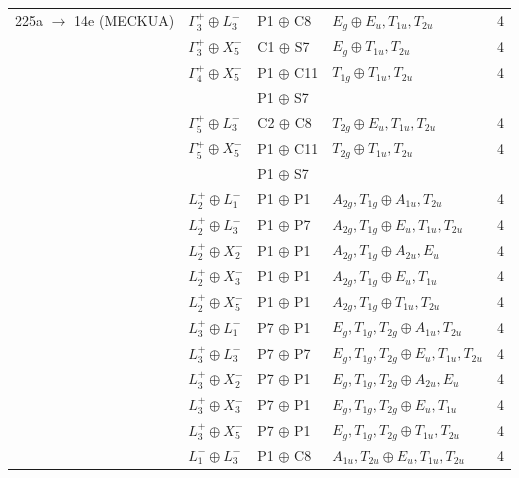 \documentclass[preprint]{iucr}              %
\begin{document}
\begin{table}
\begin{tabular}{lllll}
225a $\rightarrow$ 14e (MECKUA) & $\Gamma_3^+ \oplus L_3^-$ & P1 $\oplus$ C8 & $E_g \oplus E_u,T_{1u},T_{2u}$ & 4 \\
& $\Gamma_3^+ \oplus X_5^-$ & C1 $\oplus$ S7 & $E_g \oplus T_{1u},T_{2u}$ & 4 \\
& $\Gamma_4^+ \oplus X_5^-$ & P1 $\oplus$ C11  & $T_{1g} \oplus T_{1u},T_{2u}$ & 4 \\
& & P1 $\oplus$ S7 \\
& $\Gamma_5^+ \oplus L_3^-$ & C2 $\oplus$ C8 & $T_{2g} \oplus E_u,T_{1u},T_{2u}$ & 4 \\
& $\Gamma_5^+ \oplus X_5^-$ & P1 $\oplus$ C11 & $T_{2g} \oplus T_{1u},T_{2u}$ & 4 \\
& & P1 $\oplus$ S7 & &  \\
& $L_2^+ \oplus L_1^-$ & P1 $\oplus$ P1 & $A_{2g},T_{1g} \oplus A_{1u},T_{2u}$ & 4 \\

& $L_2^+ \oplus L_3^-$ &  P1 $\oplus$ P7 & $A_{2g},T_{1g} \oplus E_u,T_{1u},T_{2u}$ & 4 \\

& $L_2^+ \oplus X_2^-$ &  P1 $\oplus$ P1 & $A_{2g},T_{1g} \oplus A_{2u},E_u$ & 4 \\

& $L_2^+ \oplus X_3^-$ &  P1 $\oplus$ P1 & $A_{2g},T_{1g} \oplus E_u,T_{1u}$ & 4 \\

& $L_2^+ \oplus X_5^-$ &  P1 $\oplus$ P1 & $A_{2g},T_{1g} \oplus T_{1u},T_{2u}$ & 4 \\

& $L_3^+ \oplus L_1^-$ &  P7 $\oplus$ P1 & $E_g,T_{1g},T_{2g} \oplus A_{1u},T_{2u}$ & 4 \\

& $L_3^+ \oplus L_3^-$ &  P7 $\oplus$ P7 & $E_g,T_{1g},T_{2g} \oplus E_u,T_{1u},T_{2u}$ & 4 \\

& $L_3^+ \oplus X_2^-$ &  P7 $\oplus$ P1 & $E_g,T_{1g},T_{2g} \oplus A_{2u},E_u$ & 4 \\

& $L_3^+ \oplus X_3^-$ &  P7 $\oplus$ P1 & $E_g,T_{1g},T_{2g} \oplus E_u,T_{1u}$ & 4 \\

& $L_3^+ \oplus X_5^-$ &  P7 $\oplus$ P1 & $E_g,T_{1g},T_{2g} \oplus T_{1u},T_{2u}$ & 4 \\

& $L_1^- \oplus L_3^-$ &  P1 $\oplus$ C8 & $A_{1u},T_{2u} \oplus E_u,T_{1u},T_{2u}$ & 4 \\


\end{tabular}
\end{table}
\end{document}
